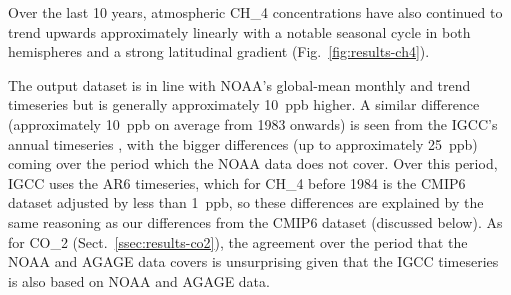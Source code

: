 Over the last 10 years, atmospheric CH_4 concentrations have also continued to trend upwards approximately linearly
with a notable seasonal cycle in both hemispheres and a strong latitudinal gradient (Fig.~\ref{fig:results-ch4}).

The output dataset is in line with NOAA's global-mean monthly and trend timeseries \citep{lan_ch4-n2o-sf6-trends_2026}
but is generally approximately 10~ppb higher.
A similar difference (approximately 10~ppb on average from 1983 onwards)
is seen from the IGCC's annual timeseries \citep{forster_igcc_2026,smith_igcc-forcings_2026},
with the bigger differences (up to approximately 25~ppb) coming over the period which the NOAA data does not cover.
Over this period, IGCC uses the AR6 timeseries, which for CH_4 before 1984 is the CMIP6 dataset adjusted by less than 1~ppb,
so these differences are explained by the same reasoning as our differences from the CMIP6 dataset (discussed below).
As for CO_2 (Sect.~\ref{ssec:results-co2}), the agreement over the period that the NOAA and AGAGE data covers
is unsurprising given that the IGCC timeseries is also based on NOAA and AGAGE data.

